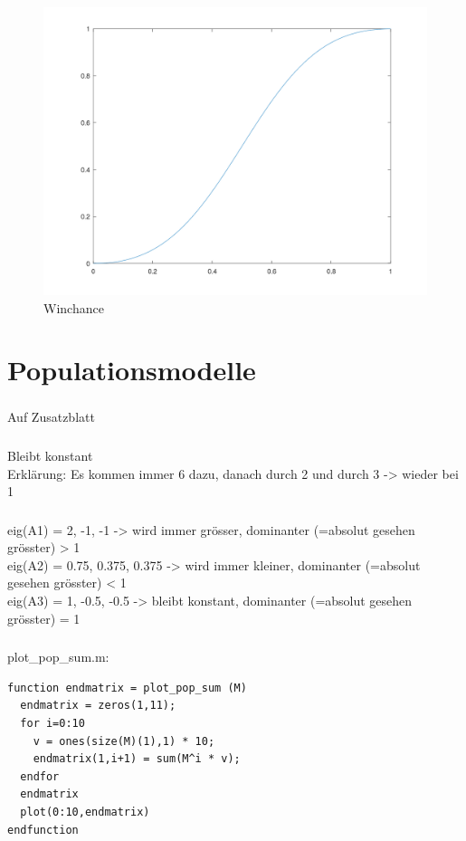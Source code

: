\documentclass{article}
\begin{document}
\begin{figure}[h!]
\centering
\includegraphics[scale=0.2]{winplot.png}
\caption{Winchance}
\label{fig:universe}
\end{figure}




\section{Populationsmodelle}
\subsubsection{}
Auf Zusatzblatt
\subsubsection{}
Bleibt konstant \\
Erklärung: Es kommen immer 6 dazu, danach durch 2 und durch 3 -> wieder bei 1
\subsubsection{}
eig(A1) = 2, -1, -1 -> wird immer grösser, dominanter (=absolut gesehen grösster) > 1 \\
eig(A2) = 0.75, 0.375, 0.375 -> wird immer kleiner, dominanter (=absolut gesehen grösster) < 1 \\
eig(A3) = 1, -0.5, -0.5 -> bleibt konstant, dominanter (=absolut gesehen grösster) = 1 \\
\subsubsection{}
plot\_pop\_sum.m:
\begin{lstlisting}
function endmatrix = plot_pop_sum (M)
  endmatrix = zeros(1,11);
  for i=0:10
    v = ones(size(M)(1),1) * 10;
    endmatrix(1,i+1) = sum(M^i * v);
  endfor
  endmatrix
  plot(0:10,endmatrix)
endfunction
\end{lstlisting}
\end{document}
